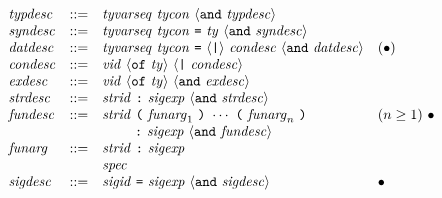 \documentclass[twoside,titlepage]{article}
\begin{document}
\begin{appendix}
$$\begin{array}{llll}
  \mathit{typdesc} & ::= & \mathit{tyvarseq}~\mathit{tycon}~\langle{\tt{and}}~\mathit{typdesc}\rangle \\
  \mathit{syndesc} & ::= & \mathit{tyvarseq}~\mathit{tycon}~\mbox{\tt=}~\mathit{ty}~\langle{\tt{and}}~\mathit{syndesc}\rangle \\
  \mathit{datdesc} & ::= & \mathit{tyvarseq}~\mathit{tycon}~\mbox{\tt=}~\langle\mbox{\tt|}\rangle~\mathit{condesc}~\langle{\tt{and}}~\mathit{datdesc}\rangle & \textrm{$(\bullet)$} \\
  \mathit{condesc} & ::= & \mathit{vid}~\langle{\tt{of}}~\mathit{ty}\rangle~\langle\mbox{\tt|}~\mathit{condesc}\rangle \\
  \mathit{exdesc} & ::= & \mathit{vid}~\langle{\tt{of}}~\mathit{ty}\rangle~\langle{\tt{and}}~\mathit{exdesc}\rangle \\
  \mathit{strdesc} & ::= & \mathit{strid}~\mbox{\tt:}~\mathit{sigexp}~\langle{\tt{and}}~\mathit{strdesc}\rangle \\
  \mathit{fundesc} & ::= & \mathit{strid}~\mbox{\tt(}~\mathit{funarg}_1~\mbox{\tt)}~\cdots~\mbox{\tt(}~\mathit{funarg}_n~\mbox{\tt)} & (n\geq1)~\bullet \\
  && ~~~~~~~\mbox{\tt:}~\mathit{sigexp}~\langle{\tt{and}}~\mathit{fundesc}\rangle \\
  \mathit{funarg} & ::= & \mathit{strid}~\mbox{\tt:}~\mathit{sigexp} \\
  && \mathit{spec} \\
  \mathit{sigdesc} & ::= & \mathit{sigid}~\mbox{\tt=}~\mathit{sigexp}~\langle{\tt{and}}~\mathit{sigdesc}\rangle & \textrm{$\bullet$} \\
  \end{array}
  $$


\end{appendix}
\end{document}
